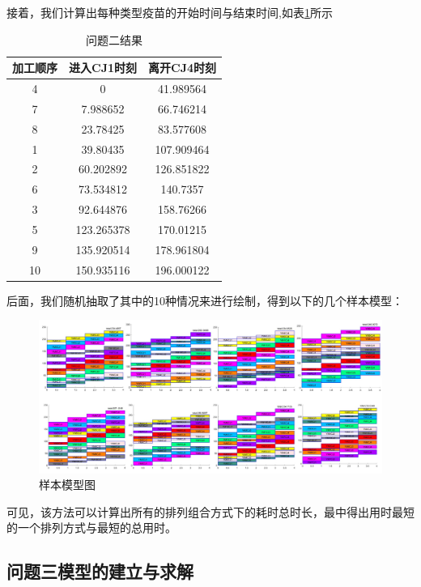 \documentclass{ctexart}
\begin{document}
接着，我们计算出每种类型疫苗的开始时间与结束时间,如表\ref{问题二}所示
\begin{table}
    \centering
    \begin{tabular}{|c|c|c|}
    \hline
        \textbf{加工顺序} & \textbf{进入CJ1时刻} & \textbf{离开CJ4时刻} \\ \hline
        4 & 0 & 41.989564 \\ \hline
        7 & 7.988652 & 66.746214 \\ \hline
        8 & 23.78425 & 83.577608 \\ \hline
        1 & 39.80435 & 107.909464 \\ \hline
        2 & 60.202892 & 126.851822 \\ \hline
        6 & 73.534812 & 140.7357 \\ \hline
        3 & 92.644876 & 158.76266 \\ \hline
        5 & 123.265378 & 170.01215 \\ \hline
        9 & 135.920514 & 178.961804 \\ \hline
        10 & 150.935116 & 196.000122 \\ \hline
    \end{tabular}
    \caption{问题二结果}
    \label{问题二}
\end{table}

\newpage

后面，我们随机抽取了其中的10种情况来进行绘制，得到以下的几个样本模型：

\begin{figure}[h]
\centerline{\includegraphics[width=0.9\linewidth]{A2图片/汇总8.JPG}}
\caption{样本模型图}
\label{样本}
\end{figure}
可见，该方法可以计算出所有的排列组合方式下的耗时总时长，最中得出用时最短的一个排列方式与最短的总用时。

\subsection{问题三模型的建立与求解}
\end{document}
